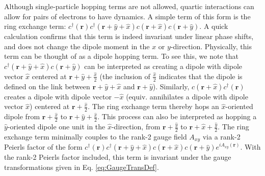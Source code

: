 \documentclass[prb,aps,twocolumn,groupaddress,floatfix]{revtex4-1}
\begin{document}
Although single-particle hopping terms are not allowed, quartic interactions can allow for pairs of electrons to have dynamics. A simple term of this form is the ring exchange term: $c^{\dagger}(\bm{r})c^{\dagger}(\bm{r}+\hat{y}+\hat{x})c(\bm{r}+\hat{x})c(\bm{r}+\hat{y})$. A quick calculation confirms that this term is indeed invariant under linear phase shifts, and does not change the dipole moment in the $x$ or $y$-direction. Physically, this term can be thought of as a dipole hopping term. To see this, we note that $c^{\dagger}(\bm{r}+\hat{y}+\hat{x})c(\bm{r}+\hat{y})$ can be interpreted as creating a dipole with dipole vector $\hat{x}$ centered at $\bm{r}+\hat{y}+\tfrac{\hat{x}}{2}$ (the inclusion of $\tfrac{\hat{x}}{2}$ indicates that the dipole is defined on the link between $\bm{r}+\hat{y}+\hat{x}$ and $\bm{r}+\hat{y}$). Similarly, $c(\bm{r}+\hat{x})c^{\dagger}(\bm{r})$ creates a dipole with dipole vector $-\hat{x}$ (equiv. annihilates a dipole with dipole vector $\hat{x}$) centered at $\bm{r}+\tfrac{\hat{x}}{2}$. The ring exchange term thereby hops an $\hat{x}$-oriented dipole from $\bm{r}+\tfrac{\hat{x}}{2}$ to $\bm{r}+\hat{y}+\tfrac{\hat{x}}{2}$. This process can also be interpreted as hopping a $\hat{y}$-oriented dipole one unit in the $\hat{x}$-direction, from $\bm{r}+\frac{\hat{y}}{2}$ to $\bm{r}+\hat{x}+\frac{\hat{y}}{2}$. The ring exchange term minimally couples to the rank-2 gauge field $A_{xy}$ via a rank-2 Peierls factor of the form $c^{\dagger}(\bm{r})c^{\dagger}(\bm{r}+\hat{y}+\hat{x})c(\bm{r}+\hat{x})c(\bm{r}+\hat{y})e^{iA_{xy}(\bm{r})}$\cite{you2019, dubinkin2019a}. With the rank-2 Peierls factor included, this term is invariant under the gauge transformations given in Eq. \ref{eq:GaugeTransDef}.
\end{document}
